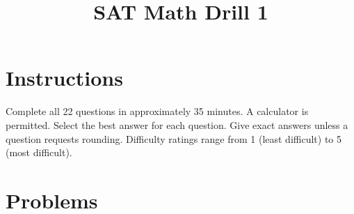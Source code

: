 \documentclass[12pt]{article}
\title{SAT Math Drill 1}
\author{}
\date{}
\begin{document}
\maketitle

\section*{Instructions}
Complete all 22 questions in approximately 35 minutes. A calculator is permitted. Select the best answer for each question. Give exact answers unless a question requests rounding. Difficulty ratings range from 1 (least difficult) to 5 (most difficult).

\section*{Problems}
\end{document}
